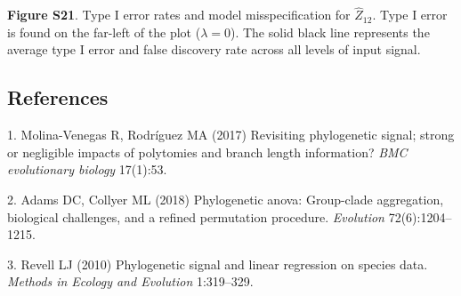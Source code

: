 \documentclass[
]{article}
\begin{document}
\textbf{Figure S21}. Type I error rates and model misspecification for
\(\hat{Z}_{12}\). Type I error is found on the far-left of the plot
(\(\lambda = 0\)). The solid black line represents the average type I
error and false discovery rate across all levels of input signal.

\newpage

\hypertarget{references}{%
\subsection*{References}\label{references}}

\hypertarget{refs}{}
\leavevmode\hypertarget{ref-MolinaVenegas2017}{}%
1. Molina-Venegas R, Rodríguez MA (2017) Revisiting phylogenetic signal;
strong or negligible impacts of polytomies and branch length
information? \emph{BMC evolutionary biology} 17(1):53.

\leavevmode\hypertarget{ref-AdamsCollyer2018b}{}%
2. Adams DC, Collyer ML (2018) Phylogenetic anova: Group-clade
aggregation, biological challenges, and a refined permutation procedure.
\emph{Evolution} 72(6):1204--1215.

\leavevmode\hypertarget{ref-Revell2010}{}%
3. Revell LJ (2010) Phylogenetic signal and linear regression on species
data. \emph{Methods in Ecology and Evolution} 1:319--329.
\end{document}
